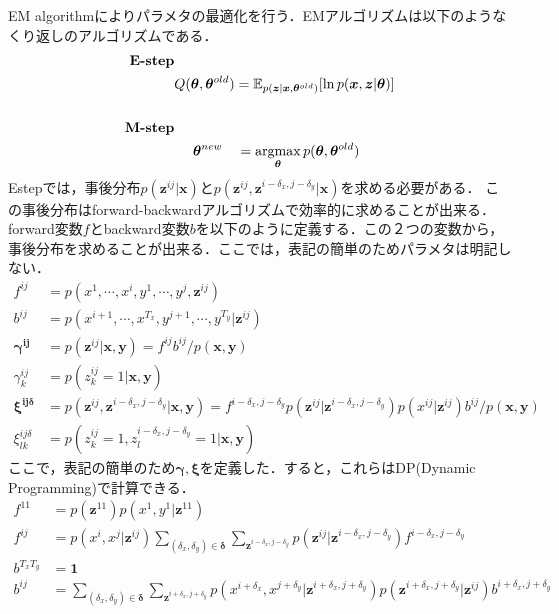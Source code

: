 \label{subsec:em}
EM algorithmによりパラメタの最適化を行う．EMアルゴリズムは以下のようなくり返しのアルゴリズムである．
\begin{align}
\mbox{\textbf{E-step}}&\\
&Q(\bm{\theta},\bm{\theta}^{old}) =
  \mathbb{E}_{p(\bm{z}|\bm{x}, \bm{\theta}^{old})}[\ln p(\bm{x}, \bm{z}| \bm{\theta})]\\ \\
\mbox{\textbf{M-step}}&\\
& \ \ \ \ \bm{\theta}^{new} \ \ \  = \mathop{\rm argmax}\limits_{\bm{\theta}} p(\bm{\theta}, \bm{\theta}^{old})
\end{align}
Estepでは，事後分布$p(\bm{z}^{ij}|\bm{x})$と$p(\bm{z}^{ij}, \bm{z}^{i-\delta_x, j-\delta_y}|\bm{x})$を求める必要がある．
この事後分布はforward-backwardアルゴリズムで効率的に求めることが出来る．forward変数$
f$とbackward変数$b$を以下のように定義する．この２つの変数から，事後分布を求めることが出来る．ここでは，表記の簡単のためパラメタは明記しない．
\begin{align}
f^{ij} &= p(x^{1},\cdots,x^i, y^1,\cdots,y^{j}, \bm{z}^{ij})\\
b^{ij} &= p(x^{i+1},\cdots,x^{T_x}, y^{j+1},\cdots,y^{T_y}| \bm{z}^{ij})\\
\bm{\gamma^{ij}} &= p(\bm{z}^{ij}|\bm{x},\bm{y}) = f^{ij} b^{ij}/p(\bm{x},\bm{y})\\
\gamma^{ij}_k &= p(z^{ij}_k = 1|\bm{x},\bm{y})\\
\bm{\xi^{ij\delta}} &= 
p(\bm{z}^{ij}, \bm{z}^{i-\delta_x, j-\delta_y}|\bm{x},\bm{y}) = 
  f^{i-\delta_x, j-\delta_y} p(\bm{z}^{ij}|\bm{z}^{i-\delta_x, j-\delta_y}) p(x^{ij}|\bm{z}^{ij})b^{ij}  / p(\bm{x},\bm{y})\\
\xi^{ij\delta}_{lk} &= p(z^{ij}_k = 1, z^{i-\delta_x, j-\delta_y}_{l}=1|\bm{x},\bm{y})
\end{align}
ここで，表記の簡単のため$\bm{\gamma},\bm{\xi}$を定義した．すると，これらはDP(Dynamic Programming)で計算できる．
\begin{align}
f^{11} &= p(\bm{z}^{11})p(x^1,y^1|\bm{z}^{11})\\
f^{ij} &=
  p(x^i, x^j|\bm{z}^{ij})
  \sum_{(\delta_x,\delta_y)\in \bm{\delta}}  \sum_{\bm{z}^{i-\delta_x, j-\delta_y}}
  p(\bm{z}^{ij}|\bm{z}^{i-\delta_x, j-\delta_y})f^{i-\delta_x, j-\delta_y}\\
b^{T_xT_y} &= \bm{1} \\
b^{ij} &=
   \sum_{(\delta_x,\delta_y)\in \bm{\delta}}  \sum_{\bm{z}^{i+\delta_x, j+\delta_y}}
         p(x^{i+\delta_x}, x^{j+\delta_y}|\bm{z}^{i+\delta_x, j+\delta_y})
  p(\bm{z}^{i+\delta_x, j+\delta_y}|\bm{z}^{ij})b^{i+\delta_x, j+\delta_y}
\end{align}
